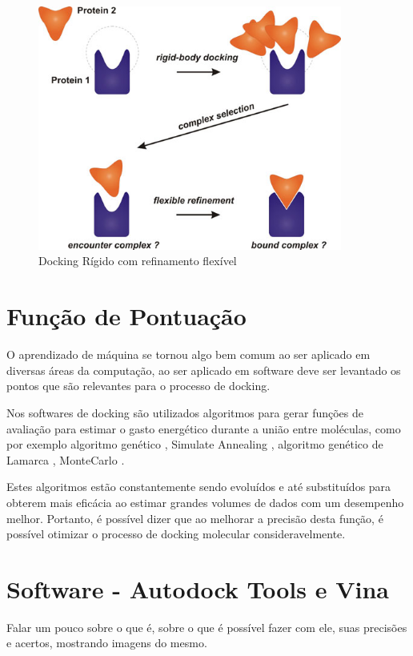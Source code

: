 \documentclass[tcc, capa]{texucpel}
\begin{document}
      \begin{figure}[!htb]
	\centering\includegraphics[width=10cm]{imagens/rigid_flexible.jpg}
	\caption{Docking Rígido com refinamento flexível}
	\end{figure}

\section{Função de Pontuação}
O aprendizado de máquina se tornou algo bem comum ao ser aplicado em diversas áreas da computação, ao ser aplicado em software deve ser levantado os pontos que são relevantes para o processo de docking.

Nos softwares de docking são utilizados algoritmos para gerar funções de avaliação para estimar o gasto energético durante a união entre moléculas, como por exemplo algoritmo genético \cite{holland1975adaptation}, Simulate Annealing \cite{kirkpatrick1984optimization} ,  algoritmo genético de Lamarca \cite{morris1998automated},  MonteCarlo \cite{caflisch1992monte}.

Estes algoritmos estão constantemente sendo evoluídos e até substituídos para obterem mais eficácia ao estimar grandes volumes de dados com um desempenho melhor.
Portanto, é possível dizer que ao melhorar a precisão desta função, é possível otimizar o processo de docking molecular consideravelmente.

\section{Software - Autodock Tools e Vina}

Falar um pouco sobre o que é, sobre o que é possível fazer com ele, suas precisões e acertos, mostrando imagens do mesmo.
\end{document}
